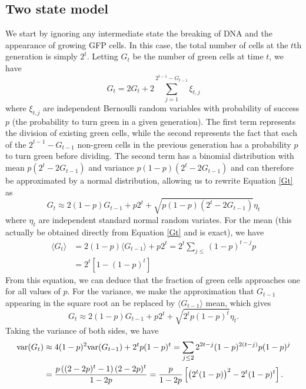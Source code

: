 \documentclass{article}
\begin{document}
\subsection{Two state model}
We start by ignoring any intermediate state the breaking of DNA and the appearance of growing GFP cells. In this case, the total number of cells at the $t$th generation is simply $2^t$. Letting $G_t$ be the number of green cells at time $t$, we have
\begin{equation}\label{Gt}
G_t = 2G_t +2 \sum_{j=1}^{2^{t-1} - G_{t-1}}\xi_{t,j}
\end{equation}
where $\xi_{t,j}$ are independent Bernoulli  random variables with probability of success $p$ (the probability to turn green in a given generation).  The first term represents the division of existing green cells, while the second represents the fact that each of the $2^{t-1}-G_{t-1}$ non-green cells in the previous generation has a probability $p$ to turn green before dividing. The second term has a binomial distribution with mean $p(2^{t} - 2G_{t-1})$ and variance $p(1-p)(2^{t} - 2G_{t-1})$ and can therefore be approximated by a normal distribution, allowing us to rewrite Equation \ref{Gt} as
\begin{equation}
G_t \approx 2(1-p)G_{t-1} + p2^{t} + \sqrt{p(1-p)(2^{t} - 2G_{t-1})}\eta_t
\end{equation}
where $\eta_t$ are independent standard normal random variates. For the mean (this actually be obtained directly from Equation \ref{Gt} and is exact), we have
\begin{align}
\langle G_t \rangle &=  2(1-p)\langle G_{t-1} \rangle  + p2^{t}  = 2^t\sum_{j\le} (1-p)^{t-j}p\\
&= 2^t \left[1-(1-p)^t\right]
\end{align}
From this equation, we can deduce that the fraction of green cells approaches one for all values of $p$. 
For the variance, we make the approximation that $G_{t-1}$ appearing in the square root an be replaced by $\langle G_{t-1} \rangle$ mean, which gives
\begin{equation}
G_t \approx 2(1-p)G_{t-1} + p2^{t} + \sqrt{2^tp(1-p)^t}\eta_t.
\end{equation}
Taking the variance of both sides, we have 
\begin{align}
{\rm var}(G_t) &\approx 4(1-p)^2{\rm var}(G_{t-1}) + 2^tp(1-p)^t  = \sum_{j\le 2} 2^{2t-j} (1-p)^{2(t-j)} p(1-p)^j\\
&= \frac{p \left((2-2 p)^t-1\right) (2-2 p)^t}{1-2 p} = \frac{p}{1-2p} \left[\left(2^t (1-p)\right)^2 - 2^t (1-p)^t \right].
\end{align}
\end{document}
